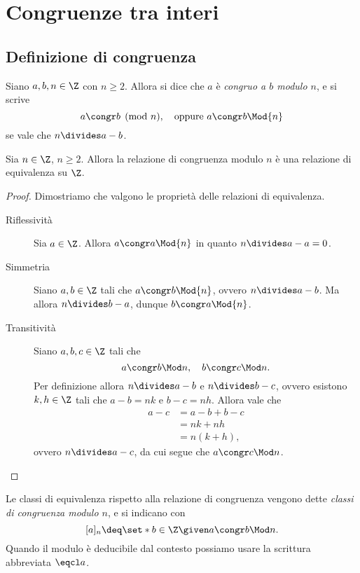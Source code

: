 \chapter{Congruenze tra interi}

\section{Definizione di congruenza}

\begin{definition}
    Siano $a, b, n \in \Z$ con $n \geq 2$. Allora si dice che $a$ è \emph{congruo a $b$ modulo $n$}, e si scrive \[
        a \congr b \pmod{n},  \quad \text{oppure }  a \congr b \Mod{n}
    \] se vale che $n \divides a - b$. 
\end{definition}

\begin{proposition}
    Sia $n \in \Z$, $n \geq 2$. Allora la relazione di congruenza modulo $n$ è una relazione di equivalenza su $\Z$.
\end{proposition}
\begin{proof}
    Dimostriamo che valgono le proprietà delle relazioni di equivalenza.
    \begin{description}
        \item[Riflessività] Sia $a \in \Z$. Allora $a \congr a \Mod{n}$ in quanto $n \divides a-a = 0$.
        \item[Simmetria] Siano $a, b \in \Z$ tali che $a \congr b \Mod{n}$, ovvero $n \divides a - b$. Ma allora $n \divides b-a$, dunque $b \congr a \Mod{n}$.
        \item[Transitività] Siano $a, b, c \in \Z$ tali che \[
            a \congr b \Mod n, \quad b \congr c \Mod n.    
        \] Per definizione allora $n \divides a - b$ e $n \divides b-c$, ovvero esistono $k, h \in \Z$ tali che $a - b = nk$ e $b - c = nh$.
        Allora vale che \begin{align*}
            a - c &= a - b + b - c \\
            &= nk + nh \\
            &= n(k + h),
        \end{align*} ovvero $n \divides a - c$, da cui segue che $a \congr c \Mod n$. \qedhere
    \end{description}
\end{proof}

Le classi di equivalenza rispetto alla relazione di congruenza vengono dette \emph{classi di congruenza modulo $n$}, e si indicano con \[
    [a]_n \deq \set*{b \in \Z \given a \congr b \Mod n}.    
\] Quando il modulo è deducibile dal contesto possiamo usare la scrittura abbreviata $\eqcl a$.

